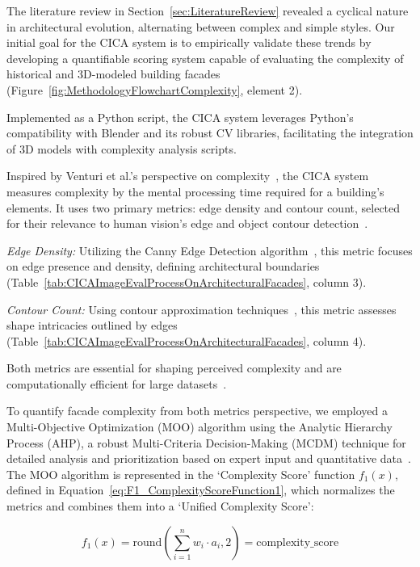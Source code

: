 
The literature review in Section~\ref{sec:LiteratureReview} revealed a cyclical nature in architectural evolution, alternating between complex and simple styles.
Our initial goal for the CICA system is to empirically validate these trends by developing a quantifiable scoring system capable of evaluating the complexity of historical and 3D-modeled building facades (Figure~\ref{fig:MethodologyFlowchartComplexity}, element 2).

Implemented as a Python script, the CICA system leverages Python's compatibility with Blender and its robust CV libraries, facilitating the integration of 3D models with complexity analysis scripts.

Inspired by Venturi et al.'s perspective on complexity~\cite{Venturi1977}, the CICA system measures complexity by the mental processing time required for a building's elements.
It uses two primary metrics: edge density and contour count, selected for their relevance to human vision's edge and object contour detection~\cite{Yang2022}.

\textit{Edge Density:} Utilizing the Canny Edge Detection algorithm~\cite{EdgeOpenCV2023}, this metric focuses on edge presence and density, defining architectural boundaries (Table~\ref{tab:CICAImageEvalProcessOnArchitecturalFacades}, column 3).

\textit{Contour Count:} Using contour approximation techniques~\cite{ContourOpenCV2023}, this metric assesses shape intricacies outlined by edges (Table~\ref{tab:CICAImageEvalProcessOnArchitecturalFacades}, column 4).

Both metrics are essential for shaping perceived complexity and are computationally efficient for large datasets~\cite{Yang2022}.

To quantify facade complexity from both metrics perspective, we employed a Multi-Objective Optimization (MOO) algorithm using the Analytic Hierarchy Process (AHP), a robust Multi-Criteria Decision-Making (MCDM) technique for detailed analysis and prioritization based on expert input and quantitative data~\cite{Taherdoost2023}.
The MOO algorithm is represented in the `Complexity Score' function \(f_1(x)\), defined in Equation~\ref{eq:F1_ComplexityScoreFunction1}, which normalizes the metrics and combines them into a `Unified Complexity Score':

\begin{equation}
    f_1(x) = \mathrm{round}\left(\sum_{i=1}^{n} w_i \cdot a_i, 2\right) = \text{complexity\_score}
    \label{eq:F1_ComplexityScoreFunction1}
\end{equation}

